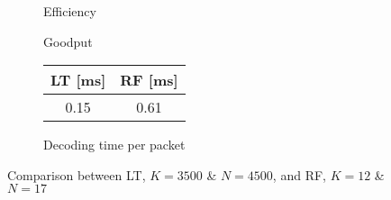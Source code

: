 \begin{figure}[!h]
\centering
\begin{subfigure}{0.23\textwidth}
	\captionsetup{justification=centering,font=scriptsize}
	\centering
	\setlength\fwidth{\textwidth}
	\setlength{}
	
	\caption{Efficiency}
	\label{fig:RF_eff}
\end{subfigure}\hspace{2em}%
\begin{subfigure}{0.23\textwidth}
	\captionsetup{justification=centering,font=scriptsize}
	\centering
	\setlength\fwidth{\textwidth}
	\setlength{}
	
	\caption{Goodput}
	\label{fig:RF_good}
\end{subfigure}\hspace{2em}%
\begin{subfigure}{0.23\textwidth}
	\captionsetup{justification=centering,font=scriptsize}
	\small
	\centering
	\begin{tabular}[c]{c|c}
		LT [ms] & RF [ms] \\ \hline
		0.15 & 0.61 \\
	\end{tabular}
	\caption{Decoding time per packet}
	\label{fig:RFLT_dectime}
\end{subfigure}
\caption{Comparison between LT, $K=3500$ \& $N=4500$, and RF, $K=12$ \& $N=17$}
\label{fig:RFLT}
\end{figure}


